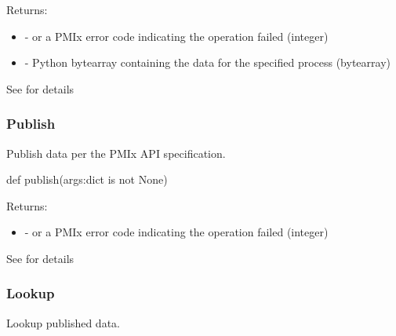 Returns:
\begin{itemize}
    \item {} -  or a \ac{PMIx} error code indicating the operation failed (integer)
    \item {} - Python bytearray containing the data for the specified process (bytearray)
\end{itemize}

See  for details


\subsubsection{Publish}

\summary

Publish data per the PMIx API specification.

\format

\pyspecificstart
\begin{codepar}
def publish(args:dict is not None)
\end{codepar}
\pyspecificend

\begin{arglist}
\end{arglist}

Returns:
\begin{itemize}
    \item {} -  or a \ac{PMIx} error code indicating the operation failed (integer)
\end{itemize}

See  for details


\subsubsection{Lookup}

\summary

Lookup published data.

